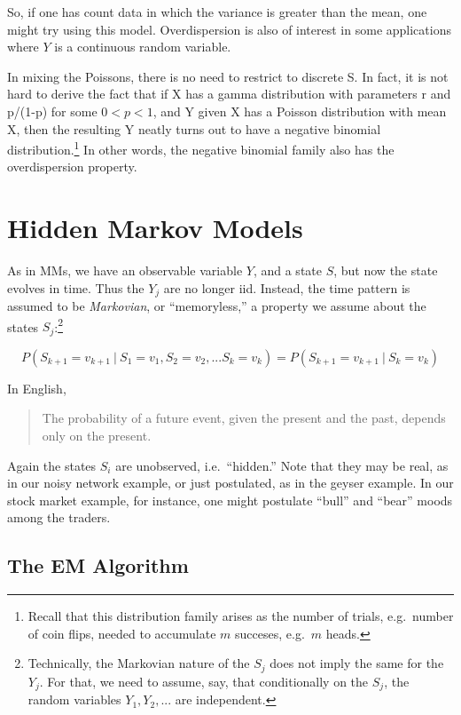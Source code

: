 \documentclass[11pt]{article}
\begin{document}
So, if one has count data in which the variance is greater than the
mean, one might try using this model.  Overdispersion is also of
interest in some applications where $Y$ is a continuous random variable.

In mixing the Poissons, there is no need to restrict to discrete S.  In
fact, it is not hard to derive the fact that if X has a gamma
distribution with parameters r and p/(1-p) for some $0 < p < 1$, and Y
given X has a Poisson distribution with mean X, then the resulting Y
neatly turns out to have a negative binomial
distribution.\footnote{Recall that this distribution family arises as
the number of trials, e.g.\ number of coin flips, needed to accumulate
$m$ succeses, e.g.\ $m$ heads.}  In other words, the negative binomial
family also has the overdispersion property.

\section{Hidden Markov Models}

As in MMs, we have an observable variable $Y$, and a state $S$, but now
the state evolves in time.  Thus the $Y_j$ are no longer iid.  Instead,
the time pattern is assumed to be \textit{Markovian}, or ``memoryless,''
a property we assume about the states $S_j$:\footnote{Technically, the
Markovian nature of the $S_j$ does not imply the same for the $Y_j$.
For that, we need to assume, say, that conditionally on the $S_j$, the
random variables $Y_1, Y_2,...$ are independent.}

\begin{equation}
P(S_{k+1} = v_{k+1} ~|~ S_1 = v_1, S_2 = v_2, ...  S_k = v_k) =
P(S_{k+1} = v_{k+1} ~|~ S_k = v_k) 
\end{equation}

In English,

\begin{quote}
The probability of a future event, given the present and the past,
depends only on the present.
\end{quote}

Again the states $S_i$ are unobserved, i.e.\ ``hidden.''  Note that they 
may be real, as in our noisy network example, or just postulated, as in
the geyser example.  In our stock market example, for instance,
one might postulate ``bull'' and ``bear'' moods among the traders.

\subsection{The EM Algorithm}
\end{document}
